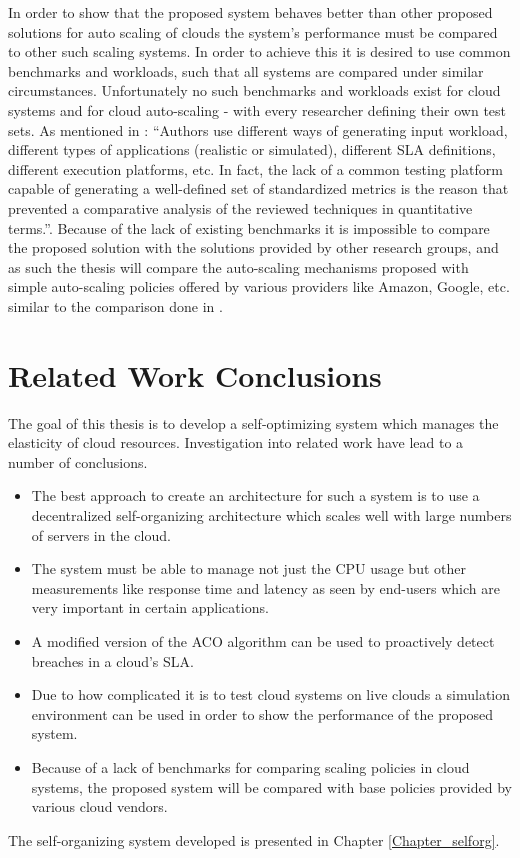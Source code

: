 In order to show that the proposed system behaves better than other proposed solutions for auto scaling of clouds the system's performance must be compared to other such scaling systems. In order to achieve this it is desired to use common benchmarks and workloads, such that all systems are compared under similar circumstances. Unfortunately no such benchmarks and workloads exist for cloud systems and for cloud auto-scaling - with every researcher defining their own test sets. As mentioned in \cite{related:cloudbench}: ``Authors use different ways of generating input workload, different types of applications (realistic or simulated), different SLA definitions, different execution platforms, etc. In fact, the lack of a common testing platform capable of generating a well-defined set of standardized metrics is the reason that prevented a comparative analysis of the reviewed techniques in quantitative terms.''. Because of the lack of existing benchmarks it is impossible to compare the proposed solution with the solutions provided by other research groups, and as such the thesis will compare the auto-scaling mechanisms proposed with simple auto-scaling policies offered by various providers like Amazon, Google, etc. similar to the comparison done in \cite{related:clousimex-scaling}.

\section{Related Work Conclusions}

The goal of this thesis is to develop a self-optimizing system which manages the elasticity of cloud resources. Investigation into related work have lead to a number of conclusions. 

\begin{itemize}
	\item The best approach to create an architecture for such a system is to use a decentralized self-organizing architecture which scales well with large numbers of servers in the cloud.
	\item The system must be able to manage not just the CPU usage but other measurements like response time and latency as seen by end-users which are very important in certain applications.
	\item A modified version of the ACO algorithm can be used to proactively detect breaches in a cloud's SLA.
	\item Due to how complicated it is to test cloud systems on live clouds a simulation environment can be used in order to show the performance of the proposed system. 
	\item Because of a lack of benchmarks for comparing scaling policies in cloud systems, the proposed system will be compared with base policies provided by various cloud vendors.
\end{itemize}

The self-organizing system developed is presented in Chapter \ref{Chapter_selforg}.